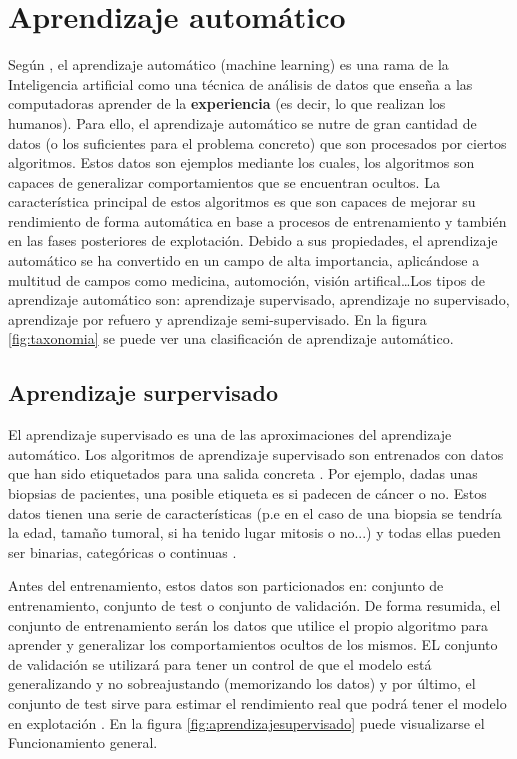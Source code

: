

\section{Aprendizaje automático}

Según \cite{intelligent:ml}, el aprendizaje automático (machine learning) es una
rama de la Inteligencia artificial como una técnica de análisis de datos que
enseña a las computadoras aprender de la \textbf{experiencia} (es decir, lo que
realizan los humanos). Para ello, el aprendizaje automático se nutre de gran
cantidad de datos (o los suficientes para el problema concreto) que son
procesados por ciertos algoritmos. Estos datos son ejemplos \cite{pascual:ml}
mediante los cuales, los algoritmos son capaces de generalizar comportamientos
que se encuentran ocultos. La característica principal de estos algoritmos es
que son capaces de mejorar su rendimiento de forma automática en base a procesos
de entrenamiento y también en las fases posteriores de explotación. Debido a sus
propiedades, el aprendizaje automático se ha convertido en un campo de alta
importancia, aplicándose a multitud de campos como medicina, automoción, visión
artifical\ldots Los tipos de aprendizaje automático son: aprendizaje
supervisado, aprendizaje no supervisado, aprendizaje por refuero y aprendizaje
semi-supervisado. En la figura \ref{fig:taxonomia} se puede ver una
clasificación de aprendizaje automático.



\subsection{Aprendizaje surpervisado}

El aprendizaje supervisado es una de las aproximaciones del aprendizaje
automático. Los algoritmos de aprendizaje supervisado son entrenados con datos
que han sido etiquetados para una salida concreta \cite{david:sl}. Por ejemplo,
dadas unas biopsias de pacientes, una posible etiqueta es si padecen de cáncer o
no. Estos datos tienen una serie de características (p.e en el caso de una
biopsia se tendría la edad, tamaño tumoral, si ha tenido lugar mitosis o no...)
y todas ellas pueden ser binarias, categóricas o continuas \cite{salim:sl}.

Antes del entrenamiento, estos datos son particionados en: conjunto de
entrenamiento, conjunto de test o conjunto de validación. De forma resumida, el
conjunto de entrenamiento serán los datos que utilice el propio algoritmo para
aprender y generalizar los comportamientos ocultos de los mismos. EL conjunto de
validación se utilizará para tener un control de que el modelo está
generalizando y no sobreajustando (memorizando los datos) y por último, el
conjunto de test sirve para estimar el rendimiento real que podrá tener el
modelo en explotación \cite{enwiki:conjuntos}. En la figura
\ref{fig:aprendizajesupervisado} puede visualizarse el Funcionamiento general.

